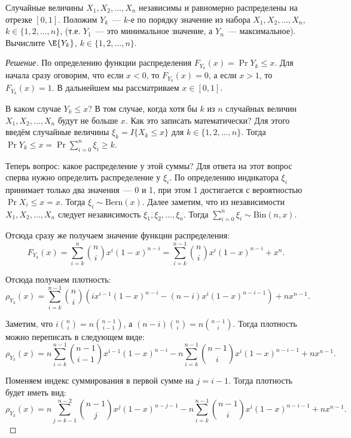 \begin{problem}
	Случайные величины \(X_1, X_2, \dots, X_n\) независимы и равномерно распределены на отрезке \([0, 1]\). Положим \(Y_k\)~--- \(k\)-е по порядку значение из набора \(X_1, X_2, \dots, X_n\), \(k \in \{1, 2, \dots, n\}\), (т.е. \(Y_1\)~--- это минимальное значение, а \(Y_n\)~--- максимальное). Вычислите \(\E{Y_k}\), \(k \in \{1, 2, \dots, n\}\).
\end{problem}
\begin{proof}[Решение]
	По определению функции распределения \(F_{Y_k}(x) = \Pr{Y_k \leq x}\). Для начала сразу оговорим, что если \(x < 0\), то \(F_{Y_k}(x) = 0\), а если \(x > 1\), то \(F_{Y_k}(x) = 1\). В дальнейшем мы рассматриваем \(x \in [0, 1]\).
	
	В каком случае \(Y_k \leq x\)? В том случае, когда хотя бы \(k\) из \(n\) случайных величин \(X_1, X_2, \dots, X_n\) будут не больше \(x\). Как это записать математически? Для этого введём случайные величины \(\xi_k = I\{X_k \leq x\}\) для \(k \in \{1, 2, \dots, n\}\). Тогда \(\Pr{Y_k \leq x} = \Pr{\sum_{i = 0}^{n} \xi_i \geq k}\).
	
	Теперь вопрос: какое распределение у этой суммы? Для ответа на этот вопрос сперва нужно определить распределение у \(\xi_i\). По определению индикатора \(\xi_i\) принимает только два значения~--- 0 и 1, при этом 1 достигается с вероятностью \(\Pr{X_i \leq x} = x\). Тогда \(\xi_i \sim \mathrm{Bern}(x)\). Далее заметим, что из независимости \(X_1, X_2, \dots, X_n\) следует независимость \(\xi_1, \xi_2, \dots, \xi_n\). Тогда \(\sum_{i = 0}^{n} \xi_i \sim \mathrm{Bin}(n, x)\).
	
	Отсюда сразу же получаем значение функции распределения:
	\[F_{Y_k}(x) = \sum_{i = k}^{n}\binom{n}{i} x^{i}(1 - x)^{n - i} = \sum_{i = k}^{n - 1}\binom{n}{i} x^{i}(1 - x)^{n - i} + x^n.\]
	
	Отсюда получаем плотность:
	\[\rho_{Y_k}(x) = \sum_{i = k}^{n - 1}\binom{n}{i}\left(ix^{i - 1}(1 - x)^{n - i} -  (n - i)x^{i}(1 - x)^{n - i - 1}\right) + nx^{n  -1}.\]
	
	Заметим, что \(i\binom{n}{i} = n\binom{n - 1}{i - 1}\), а \((n - i)\binom{n}{i} = n\binom{n - 1}{i}\). Тогда плотность можно переписать в следующем виде:
	\[\rho_{Y_k}(x) = n\sum_{i = k}^{n - 1}\binom{n - 1}{i - 1}x^{i - 1}(1 - x)^{n - i} - n\sum_{i = k}^{n - 1}\binom{n - 1}{i}x^{i}(1 - x)^{n - i - 1} + nx^{n - 1}.\]
	
	Поменяем индекс суммирования в первой сумме на \(j = i - 1\). Тогда плотность будет иметь вид:
	\[\rho_{Y_k}(x) = n\sum_{j = k - 1}^{n - 2}\binom{n - 1}{j}x^{j}(1 - x)^{n - j - 1} - n\sum_{i = k}^{n - 1}\binom{n - 1}{i}x^{i}(1 - x)^{n - i - 1} + nx^{n - 1}.\]
	

\end{proof}
